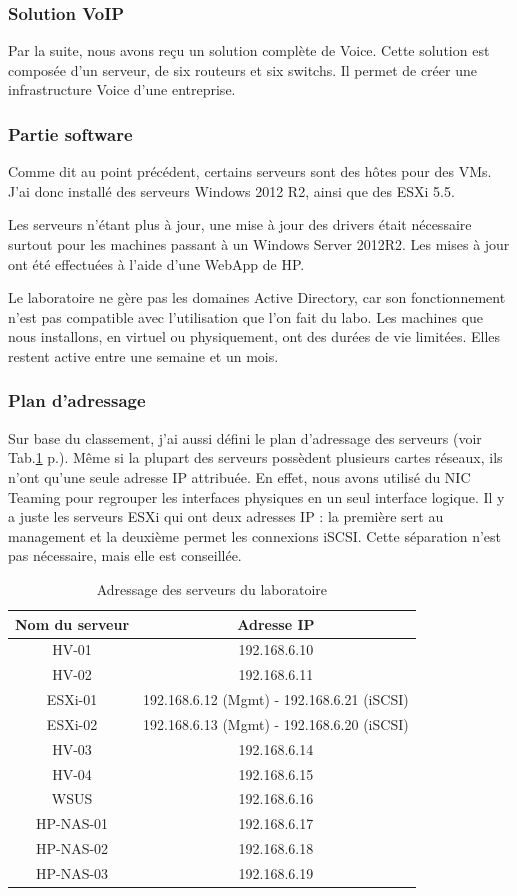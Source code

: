 \subsubsection{Solution VoIP}
Par la suite, nous avons reçu un solution complète de Voice.
Cette solution est composée d'un serveur, de six routeurs et six switchs.
Il permet de créer une infrastructure Voice d'une entreprise.

\subsubsection{Partie software}
Comme dit au point précédent, certains serveurs sont des hôtes pour des VMs.
J'ai donc installé des serveurs Windows 2012 R2, ainsi que des ESXi 5.5.

Les serveurs n'étant plus à jour, une mise à jour des drivers était nécessaire surtout pour les machines passant à un Windows Server 2012R2.
Les mises à jour ont été effectuées à l'aide d'une WebApp de HP.

Le laboratoire ne gère pas les domaines Active Directory, car son fonctionnement n'est pas compatible avec l'utilisation que l'on fait du labo. 
Les machines que nous installons, en virtuel ou physiquement, ont des durées de vie limitées.
Elles restent active entre une semaine et un mois.

\subsubsection{Plan d'adressage}
Sur base du classement, j'ai aussi défini le plan d'adressage des serveurs (voir Tab.\ref{tab:addIP} p.\pageref{tab:addIP}).
Même si la plupart des serveurs possèdent plusieurs cartes réseaux, ils n'ont qu'une seule adresse IP attribuée.
En effet, nous avons utilisé du NIC Teaming pour regrouper les interfaces physiques en un seul interface logique.
Il y a juste les serveurs ESXi qui ont deux adresses IP : la première sert au management et la deuxième permet les connexions iSCSI.
Cette séparation n'est pas nécessaire, mais elle est conseillée.
\begin{table}
\centering
\begin{tabular}{cc}
\toprule
Nom du serveur & Adresse IP \\
\midrule
HV-01 & 192.168.6.10 \\ 
HV-02 & 192.168.6.11 \\ 
ESXi-01 & 192.168.6.12 (Mgmt) - 192.168.6.21 (iSCSI) \\ 
ESXi-02 & 192.168.6.13 (Mgmt) - 192.168.6.20 (iSCSI) \\ 
HV-03 & 192.168.6.14 \\ 
HV-04 & 192.168.6.15 \\ 
WSUS & 192.168.6.16 \\ 
HP-NAS-01 & 192.168.6.17 \\ 
HP-NAS-02 & 192.168.6.18 \\ 
HP-NAS-03 & 192.168.6.19 \\
\bottomrule
\end{tabular}
\caption{Adressage des serveurs du laboratoire}
\label{tab:addIP}
\end{table}


